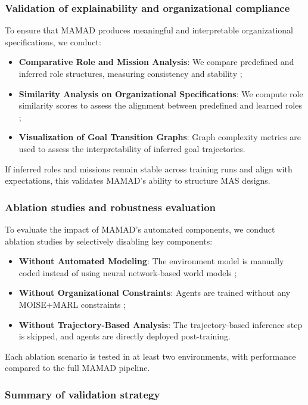 \documentclass[pdflatex,sn-mathphys-num]{sn-jnl}%
\theoremstyle{thmstyleone}%
\theoremstyle{thmstyletwo}%
\theoremstyle{thmstylethree}%
\begin{document}
\subsubsection{Validation of explainability and organizational compliance}
To ensure that MAMAD produces meaningful and interpretable organizational specifications, we conduct:
\begin{itemize}
    \item \textbf{Comparative Role and Mission Analysis}: We compare predefined and inferred role structures, measuring consistency and stability ;
    \item \textbf{Similarity Analysis on Organizational Specifications}: We compute role similarity scores to assess the alignment between predefined and learned roles ;
    \item \textbf{Visualization of Goal Transition Graphs}: Graph complexity metrics are used to assess the interpretability of inferred goal trajectories.
\end{itemize}

If inferred roles and missions remain stable across training runs and align with expectations, this validates MAMAD's ability to structure MAS designs.

\subsubsection{Ablation studies and robustness evaluation}
To evaluate the impact of MAMAD's automated components, we conduct ablation studies by selectively disabling key components:
\begin{itemize}
    \item \textbf{Without Automated Modeling}: The environment model is manually coded instead of using neural network-based world models ;
    \item \textbf{Without Organizational Constraints}: Agents are trained without any MOISE+MARL constraints ;
    \item \textbf{Without Trajectory-Based Analysis}: The trajectory-based inference step is skipped, and agents are directly deployed post-training.
\end{itemize}

Each ablation scenario is tested in at least two environments, with performance compared to the full MAMAD pipeline.

\subsubsection{Summary of validation strategy}
\end{document}
